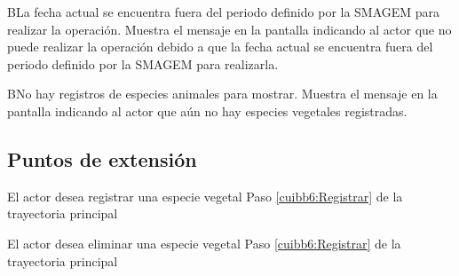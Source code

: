     \begin{UCtrayectoriaA}{B}{La fecha actual se encuentra fuera del periodo definido por la SMAGEM para realizar la operación.}
    \UCpaso[\UCsist] Muestra el mensaje  en la pantalla  indicando al actor que no puede realizar la operación debido a que la fecha actual se encuentra fuera del periodo definido por la SMAGEM para realizarla. 
 \end{UCtrayectoriaA}
 
  \begin{UCtrayectoriaA}{B}{No hay registros de especies animales para mostrar.}
    \UCpaso[\UCsist] Muestra el mensaje  en la pantalla  indicando al actor que aún no hay especies vegetales registradas. 
 \end{UCtrayectoriaA}


\subsection{Puntos de extensión}

\UCExtensionPoint
{El actor desea registrar una especie vegetal}
{ Paso \ref{cuibb6:Registrar} de la trayectoria principal}
{}

\UCExtensionPoint
{El actor desea eliminar una especie vegetal}
{ Paso \ref{cuibb6:Registrar} de la trayectoria principal}
{}
